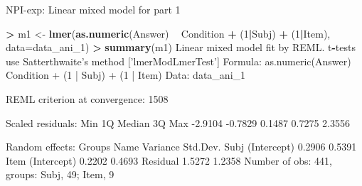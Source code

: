 \documentclass[ignorenonframetext,]{beamer}
\newenvironment{Shaded}{\begin{snugshade}}{\end{snugshade}}
\newcommand{\KeywordTok}[1]{\textcolor[rgb]{0.13,0.29,0.53}{\textbf{#1}}}
\newcommand{\DataTypeTok}[1]{\textcolor[rgb]{0.13,0.29,0.53}{#1}}
\newcommand{\DecValTok}[1]{\textcolor[rgb]{0.00,0.00,0.81}{#1}}
\newcommand{\StringTok}[1]{\textcolor[rgb]{0.31,0.60,0.02}{#1}}
\newcommand{\OperatorTok}[1]{\textcolor[rgb]{0.81,0.36,0.00}{\textbf{#1}}}
\newcommand{\NormalTok}[1]{#1}
\begin{document}
\begin{frame}[fragile]{NPI-exp: Linear mixed model for part 1}

\tiny

\begin{Shaded}
\begin{Highlighting}[]
\OperatorTok{>}\StringTok{ }\NormalTok{m1 <-}\StringTok{ }\KeywordTok{lmer}\NormalTok{(}\KeywordTok{as.numeric}\NormalTok{(Answer) }\OperatorTok{~}\StringTok{ }\NormalTok{Condition }\OperatorTok{+}\StringTok{ }\NormalTok{(}\DecValTok{1}\OperatorTok{|}\NormalTok{Subj) }\OperatorTok{+}\StringTok{ }\NormalTok{(}\DecValTok{1}\OperatorTok{|}\NormalTok{Item), }\DataTypeTok{data=}\NormalTok{data_ani_}\DecValTok{1}\NormalTok{)}
\OperatorTok{>}\StringTok{ }\KeywordTok{summary}\NormalTok{(m1)}
\NormalTok{Linear mixed model fit by REML. t}\OperatorTok{-}\NormalTok{tests use Satterthwaite}\StringTok{'s method ['}\NormalTok{lmerModLmerTest}\StringTok{']}
\StringTok{Formula: as.numeric(Answer) ~ Condition + (1 | Subj) + (1 | Item)}
\StringTok{   Data: data_ani_1}

\StringTok{REML criterion at convergence: 1508}

\StringTok{Scaled residuals: }
\StringTok{    Min      1Q  Median      3Q     Max }
\StringTok{-2.9104 -0.7829  0.1487  0.7275  2.3556 }

\StringTok{Random effects:}
\StringTok{ Groups   Name        Variance Std.Dev.}
\StringTok{ Subj     (Intercept) 0.2906   0.5391  }
\StringTok{ Item     (Intercept) 0.2202   0.4693  }
\StringTok{ Residual             1.5272   1.2358  }
\StringTok{Number of obs: 441, groups:  Subj, 49; Item, 9}
\end{Highlighting}
\end{Shaded}

\end{frame}
\end{document}
